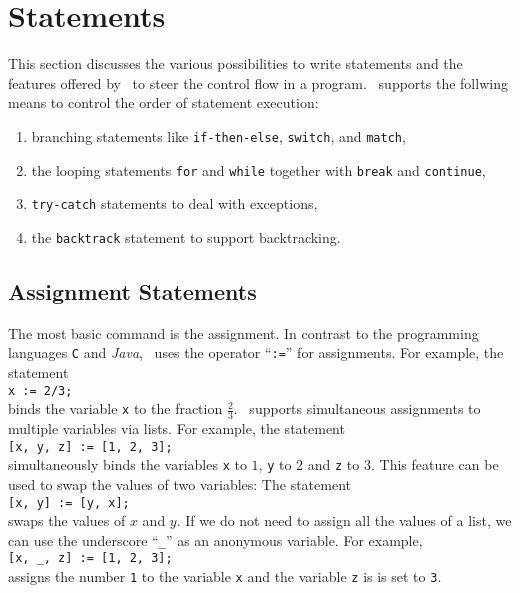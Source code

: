 \chapter{Statements}
This section discusses the various possibilities to write statements and the 
features offered by \setlx\ to steer the control flow in a program.
\setlx\ supports the follwing means to control the order of statement execution:
\begin{enumerate}
\item branching statements like \texttt{if-then-else}, \texttt{switch}, and \texttt{match},
\item the looping statements \texttt{for} and \texttt{while} together with \texttt{break} and
      \texttt{continue}, 
\item \texttt{try-catch} statements to deal with exceptions,
\item the \texttt{backtrack} statement to support backtracking.
\end{enumerate}

\section{Assignment Statements}
The most basic command is the assignment.  In contrast to the programming languages \texttt{C}
and \textsl{Java}, \setlx\ uses the operator ``\texttt{:=}'' for assignments.  For example, the statement
\\[0.2cm]
\hspace*{1.3cm}
\texttt{x := 2/3;}
\\[0.2cm]
binds the variable \texttt{x} to the fraction $\frac{2}{3}$.  \setlx\ supports simultaneous
assignments to multiple variables via lists.  For example, the statement
\\[0.2cm]
\hspace*{1.3cm}
\texttt{[x, y, z] := [1, 2, 3];}
\\[0.2cm]
simultaneously binds the variables \texttt{x} to $1$, \texttt{y} to $2$ and \texttt{z} to $3$.
This feature can be used to swap the values of two variables:  The statement
\\[0.2cm]
\hspace*{1.3cm}
\texttt{[x, y] := [y, x];}
\\[0.2cm]
swaps the values of $x$ and $y$.  If we do not need to assign all the values of a list, we
can use the underscore ``\texttt{\_}'' as an anonymous variable.  For example,
\\[0.2cm]
\hspace*{1.3cm}
\texttt{[x, \_, z] := [1, 2, 3];} 
\\[0.2cm]
assigns the number \texttt{1} to the variable \texttt{x} and the variable \texttt{z} is
is set to \texttt{3}.

